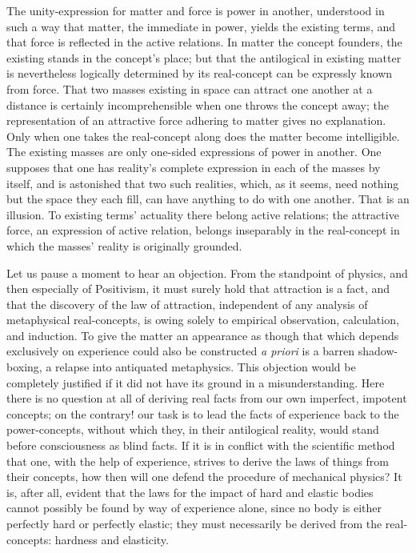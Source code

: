\documentclass[12pt]{article}
\begin{document}
The unity-expression for matter and force is power in another, understood in
such a way that matter, the immediate in power, yields the existing terms,
and that force is reflected in the active relations. In matter the concept
founders, the existing stands in the concept's place; but that the
antilogical in existing matter is nevertheless logically determined by its
real-concept can be expressly known from force. That two masses existing in
space can attract one another at a distance is certainly incomprehensible
when one throws the concept away; the representation of an attractive force
adhering to matter gives no explanation. Only when one takes the
real-concept along does the
matter become intelligible. The existing masses are only one-sided
expressions of power in another. One supposes that one has reality's
complete expression in each of the masses by itself, and is astonished that
two such realities, which, as it seems, need nothing but the space they each
fill, can have anything to do with one another. That is an illusion. To
existing terms' actuality there belong active relations; the attractive
force, an expression of active relation, belongs inseparably in the
real-concept in which the masses' reality is originally grounded.

Let us pause a moment to hear an objection. From the standpoint of physics,
and then especially of Positivism, it must surely hold that attraction is a
fact, and that the discovery of the law of attraction, independent of any
analysis of metaphysical real-concepts, is owing solely to empirical
observation, calculation, and induction. To give the matter an appearance as
though that which depends exclusively on experience could also be
constructed \textit{a priori} is a barren shadow-boxing, a relapse into
antiquated metaphysics. This objection would be completely justified if it
did not have its ground in a misunderstanding. Here there is no question at
all of deriving real facts from our own imperfect, impotent concepts; on the
contrary! our task is to lead the facts of experience back to the
power-concepts, without which they, in their antilogical reality, would
stand before consciousness as blind facts. If it is in conflict with the
scientific method that one, with the help of experience, strives to derive
the laws of things from their concepts, how then will one defend the
procedure of mechanical physics? It is, after all, evident that the laws for
the impact of hard and elastic bodies cannot possibly be found by way of
experience alone, since no body is either perfectly hard or perfectly
elastic; they must necessarily be derived from the real-concepts: hardness
and elasticity.
\end{document}
